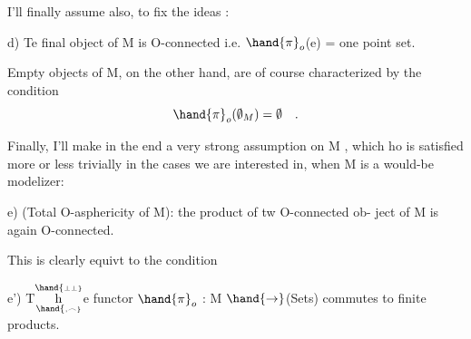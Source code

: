 I'll finally assume also,  to fix the ideas :

d)  Te final object of M is O-connected i.e. $\hand{\pi}_o$(e) = one point set.

Empty objects of M, on the other hand,  are of course characterized
by the condition
\[ \hand{\pi}_o(\emptyset_M) = \emptyset \quad . \]

Finally,  I'll make in the end a very strong assumption on M , which
ho is satisfied more or less trivially in the cases we are interested
in,  when M is a would-be modelizer:

e)  (Total O-asphericity of M):  the product of tw O-connected ob-%
ject of M is again O-connected.

This is clearly equivt to the condition

e')  T$\overset{\hand{\scriptscriptstyle\perp\perp}}{\underset{\hand{\scriptscriptstyle,\frown}}{\mathrm h}}$e functor $\hand{\pi}_o$ : M $\hand{\to}$(Sets)  commutes to finite products.

